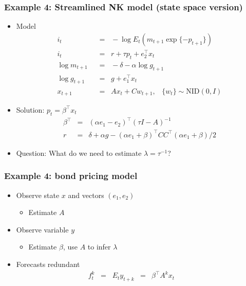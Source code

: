 \documentclass{beamer}
\begin{document}
\begin{frame}
\frametitle{Example 4: Streamlined NK model (state space version)}
\begin{itemize} \itemsep=\bigskipamount
\item Model
\begin{align*}
    i_t &\;\;=\;\;  - \log E_t \left( m_{t+1} \exp\{- p_{t+1}\} \right)  \tag{Euler equation} \\
    i_t &\;\;=\;\;  r + \tau p_{t} +  e_2^\top x_{t} \tag{Taylor rule} \\
    \log m_{t+1} &\;\;=\;\; - \delta - \alpha \log g_{t+1} \\
    \log g_{t+1} &\;\;=\;\; g + e_1^\top x_t \\
    x_{t+1} &\;\;=\;\; A x_{t} + C w_{t+1},
            \;\;\;\{ w_t \} \sim \mbox{NID}(0,I)
\end{align*}
\item Solution:  $ p_t = \beta^\top x_t $ 
\begin{eqnarray*}
    \beta^\top &=& (\alpha e_1 - e_2)^\top (\tau I - A)^{-1} \\
    r &=& \delta + \alpha g - (\alpha e_1 + \beta)^\top C C^\top (\alpha e_1 + \beta)/2 
\end{eqnarray*}

\item Question:  What do we need to estimate $\lambda = \tau^{-1}$?
\end{itemize}
\end{frame}

\begin{frame}
\frametitle{Example 4: bond pricing model}
\begin{itemize}  \itemsep=\bigskipamount
\item Observe state $x$ and vectors $(e_1,e_2)$\\
\begin{itemize}
\item Estimate $A$ \;
\end{itemize}
\item Observe variable $y$ \\
\begin{itemize}
\item Estimate $\beta$, use $A$ to infer $\lambda$
\end{itemize}
\item Forecasts redundant
\begin{eqnarray*}
    f^k_t \;\;=\;\; E_t y_{t+k} &=& \beta^\top A^k x_t \phantom{xxxx}
\end{eqnarray*}
\end{itemize}
\end{frame}
\end{document}
